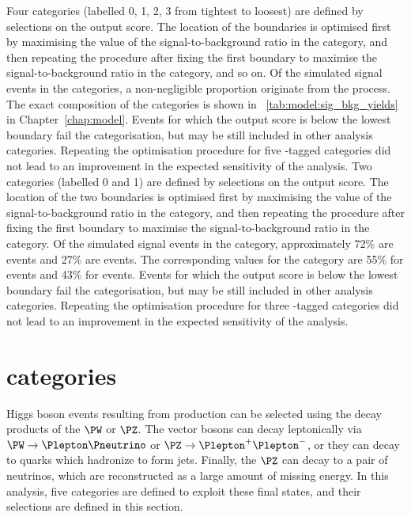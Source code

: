 \ifNewAnalysis
Four \VBFTag categories (labelled 0, 1, 2, 3 from tightest to loosest) are defined by selections on the \DiPhoDiJetBdt output score. 
The location of the boundaries is optimised first by maximising the value of the signal-to-background ratio in the  category, and then repeating the procedure after fixing the first boundary to maximise the signal-to-background ratio in the  category, and so on. Of the simulated signal events in the \VBFTag categories, a non-negligible proportion originate from the \ggH process. The exact composition of the categories is shown in \Table~\ref{tab:model:sig_bkg_yields} in Chapter~\ref{chap:model}. Events for which the \DiPhoDiJetBdt output score is below the lowest boundary fail the \VBFTag categorisation, but may be still included in other analysis categories. Repeating the optimisation procedure for five \VBF-tagged categories did not lead to an improvement in the expected sensitivity of the analysis.
\else
Two \VBFTag categories (labelled 0 and 1) are defined by selections on the \DiPhoDiJetBdt output score. 
The location of the two boundaries is optimised first by maximising the value of the signal-to-background ratio in the  category, and then repeating the procedure after fixing the first boundary to maximise the signal-to-background ratio in the  category. Of the simulated signal events in the  category, approximately 72\% are \VBF events and 27\% are \ggH events. The corresponding values for the  category are 55\% for \VBF events and 43\% for \ggH events. Events for which the \DiPhoDiJetBdt output score is below the lowest boundary fail the \VBFTag categorisation, but may be still included in other analysis categories. Repeating the optimisation procedure for three \VBF-tagged categories did not lead to an improvement in the expected sensitivity of the analysis.
\fi

\ifNewAnalysis
\section{\VHTag categories}
\label{cat:sec:vhtag}

Higgs boson events resulting from \VH production can be selected using the decay products of the $\PW$ or $\PZ$. The vector bosons can decay leptonically via $\PW \rightarrow \Plepton \Pneutrino$ or $\PZ \rightarrow \Plepton^{+} \Plepton^{-}$, or they can decay to quarks which hadronize to form jets. Finally, the $\PZ$ can decay to a pair of neutrinos, which are reconstructed as a large amount of missing energy. In this analysis, five categories are defined to exploit these final states, and their selections are defined in this section. %

